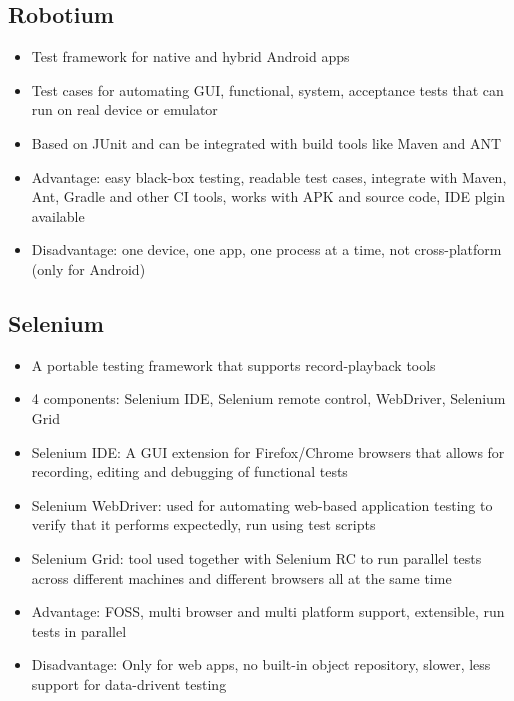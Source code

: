 \documentclass{article}
\begin{document}
\subsection{Robotium}
\begin{itemize}
    \item Test framework for native and hybrid Android apps
    
    \item Test cases for automating GUI, functional, system, acceptance tests that can run on real device or emulator
    
    \item Based on JUnit and can be integrated with build tools like Maven and ANT
    
    \item Advantage: easy black-box testing, readable test cases, integrate with Maven, Ant, Gradle and other CI tools, works with APK and source code, IDE plgin available
    
    \item Disadvantage: one device, one app, one process at a time, not cross-platform (only for Android)
\end{itemize}

\subsection{Selenium}
\begin{itemize}
    \item A portable testing framework that supports record-playback tools
    
    \item 4 components: Selenium IDE, Selenium remote control, WebDriver, Selenium Grid
    
    \item Selenium IDE: A GUI extension for Firefox/Chrome browsers that allows for recording, editing and debugging of functional tests
    
    \item Selenium WebDriver: used for automating web-based application testing to verify that it performs expectedly, run using test scripts
    
    \item Selenium Grid: tool used together with Selenium RC to run  parallel tests across different machines and different browsers all  at the same time
    
    \item Advantage: FOSS, multi browser and multi platform support, extensible, run tests in parallel
    
    \item Disadvantage: Only for web apps, no built-in object repository, slower, less support for data-drivent testing
\end{itemize}
\end{document}
